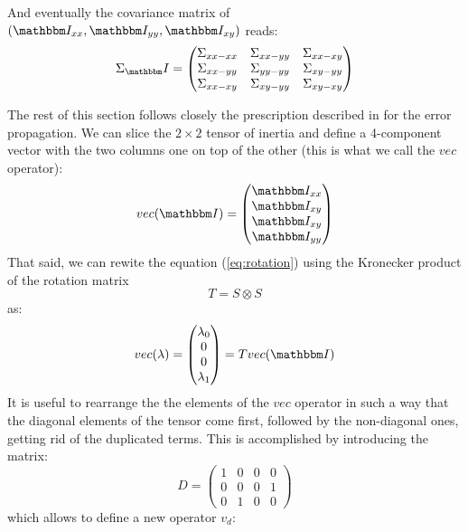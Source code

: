\documentclass[a4paper,11pt]{article}
\newcommand{\itm}{\mathbbm I}
\newcommand{\itc}[1]{\itm_{#1}}
\begin{document}
And eventually the covariance matrix of $(\itc{xx}, \itc{yy}, \itc{xy})$
reads:
\begin{equation}
  \Sigma_\itm = 
  \begin{pmatrix}
    \Sigma_{xx-xx} & \Sigma_{xx-yy} & \Sigma_{xx-xy}\\
    \Sigma_{xx-yy} & \Sigma_{yy-yy} & \Sigma_{xy-yy}\\
    \Sigma_{xx-xy} & \Sigma_{xy-yy} & \Sigma_{xy-xy}
  \end{pmatrix}
\end{equation}

The rest of this section follows closely the prescription described in
\cite{errors} for the error propagation. We can slice the $2 \times 2$ tensor
of inertia and define a 4-component vector with the two columns one on top 
of the other (this is what we call the $vec$ operator):
\begin{equation}
  vec(\itm) = 
  \begin{pmatrix}
    \itc{xx}\\
    \itc{xy}\\
    \itc{xy}\\
    \itc{yy}
  \end{pmatrix}
\end{equation}
That said, we can rewite the equation (\ref{eq:rotation}) using the
Kronecker product of the rotation matrix
$$
T = S \otimes S
$$
as:
\begin{equation}\label{eq:tensor_transform}
  vec(\lambda) = 
  \begin{pmatrix}
    \lambda_0\\
    0\\
    0\\
    \lambda_1
  \end{pmatrix} = T vec(\itm)
\end{equation}
It is useful to rearrange the the elements of the $vec$ operator in such a way
that the diagonal elements of the tensor come first, followed by the
non-diagonal ones, getting rid of the duplicated terms.
This is accomplished by introducing the matrix:
\begin{equation}
  D = 
  \begin{pmatrix}
    1 & 0 & 0 & 0\\
    0 & 0 & 0 & 1\\
    0 & 1 & 0 & 0
  \end{pmatrix}
\end{equation}
which allows to define a new operator $v_d$:
\end{document}
